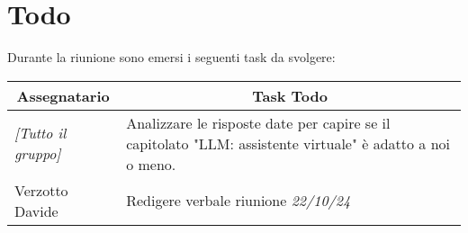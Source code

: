 \section{Todo}

Durante la riunione sono emersi i seguenti task da svolgere:

\vspace{0.5cm}

\begin{table}[htbp]
\begin{tabular}{|p{}|p{}|}
    \hline
    \multicolumn{1}{|c|}{\textbf{Assegnatario}} & \multicolumn{1}{|c|}{\textbf{Task Todo}} \\
    \hline
    \emph{[Tutto il gruppo]} & Analizzare le risposte date per capire se il
capitolato "LLM: assistente virtuale" è adatto a noi o meno.  \\
    \hline
    Verzotto Davide & Redigere verbale riunione \emph{22/10/24} \\
    \hline
\end{tabular}
\end{table}